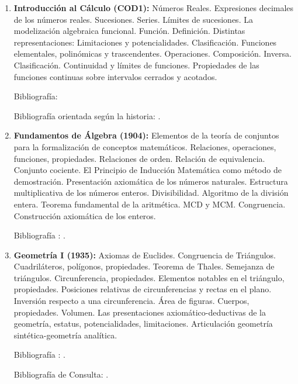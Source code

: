 \documentclass[a4paper, 12pt]{article}
\begin{document}
\begin{enumerate}

\item \textbf{Introducción al Cálculo  (COD1):} Números Reales. Expresiones decimales de los números reales. Sucesiones. Series. Límites de sucesiones.  La modelización algebraica funcional. Función. Definición. Distintas representaciones: Limitaciones y potencialidades. Clasificación. Funciones elementales, polinómicas y trascendentes. Operaciones. Composición. Inversa. Clasificación.  Continuidad y límites de funciones. Propiedades de las funciones continuas sobre intervalos cerrados y acotados. 

Bibliografía: \cite{PeterD.Lax631,MichaelSpivak649,thomas2005calculo}
 

Bibliografía orientada según la historia: \cite{ErnstHairer633,DavidApplebaum639,OttoToeplitz642,DavidBressoud643,DavidM.Bressoud651,DavidM.Bressoud688}.


 
\item \textbf{Fundamentos de Álgebra (1904):}
Elementos de la teoría de conjuntos para la formalización de conceptos matemáticos. Relaciones, operaciones, funciones, propiedades. Relaciones de orden. Relación de equivalencia. Conjunto cociente. El Principio de Inducción Matemática como método de demostración. Presentación axiomática de los números naturales. Estructura multiplicativa de los números enteros. Divisibilidad. Algoritmo de la división entera. Teorema fundamental de la aritmética. MCD y MCM. Congruencia.  Construcción axiomática de los enteros.


Bibliografía : \cite{gentile, grimaldi}.




\item \textbf{Geometría I (1935):} Axiomas de Euclides. Congruencia de Triángulos. Cuadriláteros, polígonos, propiedades. Teorema de Thales. Semejanza de triángulos. Circunferencia, propiedades. Elementos notables en el triángulo, propiedades. Posiciones relativas de circunferencias y rectas en el plano. Inversión respecto a una circunferencia. Área de figuras.  Cuerpos, propiedades. Volumen.  Las presentaciones axiomático-deductivas de la geometría, estatus, potencialidades, limitaciones. Articulación geometría sintética-geometría analítica.

Bibliografía : \cite{AllanBerele41,RogerFenn248,RobinHartshorne131,AlfredS.Posamentier49}.

Bibliografía de Consulta: \cite{O.Bottema149,CharlesStanleyOgilvy129,AllanBerele41,GerardA.Venema145,H.S.M.Coxeter226,H.S.M.Coxeter35,MatthewHarvey261,RogerA.Johnson42,coxeter,GJE,villamayor}.





\end{enumerate}
\end{document}
